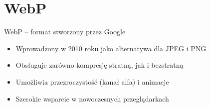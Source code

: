 \documentclass[aspectratio=1610]{beamer}
\begin{document}





\section{WebP}

\begin{frame}{WebP – format stworzony przez Google}
    \begin{itemize}
        \item Wprowadzony w 2010 roku jako alternatywa dla JPEG i PNG
        \item Obsługuje zarówno kompresję stratną, jak i bezstratną
        \item Umożliwia przezroczystość (kanał alfa) i animacje
        \item Szerokie wsparcie w nowoczesnych przeglądarkach
    \end{itemize}
\end{frame}
\end{document}
